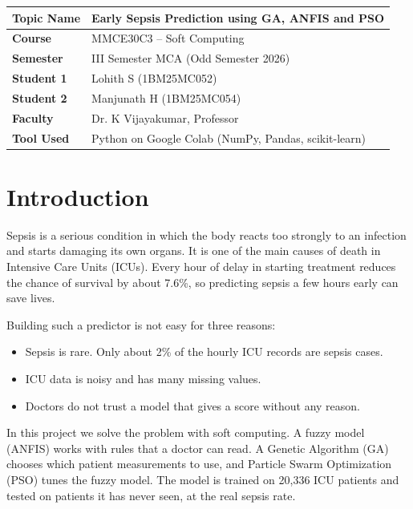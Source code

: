 \documentclass[11pt,a4paper]{article}
\begin{document}
\begin{center}
\begin{tabular}{|p{3.2cm}|p{10.5cm}|}
\hline
\textbf{Topic Name} & Early Sepsis Prediction using GA, ANFIS and PSO\\\hline
\textbf{Course} & MMCE30C3 -- Soft Computing\\\hline
\textbf{Semester} & III Semester MCA (Odd Semester 2026)\\\hline
\textbf{Student 1} & Lohith S (1BM25MC052)\\\hline
\textbf{Student 2} & Manjunath H (1BM25MC054)\\\hline
\textbf{Faculty} & Dr. K Vijayakumar, Professor\\\hline
\textbf{Tool Used} & Python on Google Colab (NumPy, Pandas, scikit-learn)\\\hline
\end{tabular}
\end{center}

\section{Introduction}
Sepsis is a serious condition in which the body reacts too strongly to an infection and starts damaging its own organs. It is one of the main causes of death in Intensive Care Units (ICUs). Every hour of delay in starting treatment reduces the chance of survival by about 7.6\%, so predicting sepsis a few hours early can save lives.

Building such a predictor is not easy for three reasons:
\begin{itemize}[nosep]
\item Sepsis is rare. Only about 2\% of the hourly ICU records are sepsis cases.
\item ICU data is noisy and has many missing values.
\item Doctors do not trust a model that gives a score without any reason.
\end{itemize}
In this project we solve the problem with soft computing. A fuzzy model (ANFIS) works with rules that a doctor can read. A Genetic Algorithm (GA) chooses which patient measurements to use, and Particle Swarm Optimization (PSO) tunes the fuzzy model. The model is trained on 20,336 ICU patients and tested on patients it has never seen, at the real sepsis rate.
\end{document}
